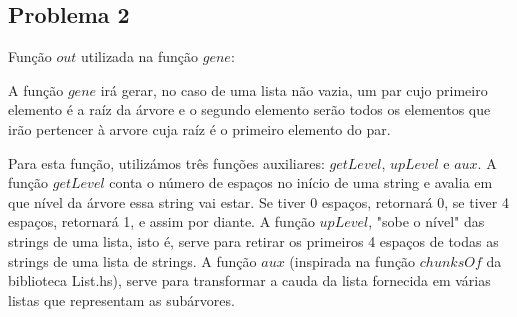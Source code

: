 \documentclass[a4paper]{article}
\newcommand{\Conid}[1]{\mathit{#1}}
\newcommand{\Varid}[1]{\mathit{#1}}
\def\resethooks{%
  \global\let\SaveRestoreHook\empty
  \global\let\ColumnHook\empty}
\let\hspre\empty
\let\hspost\empty
\begin{document}
\subsection*{Problema 2}
Função \ensuremath{\Varid{out}} utilizada na função \ensuremath{\Varid{gene}}:
\resethooks

A função \ensuremath{\Varid{gene}} irá gerar, no caso de uma lista não vazia, um par cujo primeiro elemento é a raíz
da árvore e o segundo elemento serão todos os elementos que irão pertencer à arvore cuja raíz é o primeiro
elemento do par.

Para esta função, utilizámos três funções auxiliares: \ensuremath{\Varid{getLevel}}, \ensuremath{\Varid{upLevel}} e \ensuremath{\Varid{aux}}.
A função \ensuremath{\Varid{getLevel}} conta o número de espaços no início de uma string e avalia em que nível da árvore essa
string vai estar. Se tiver 0 espaços, retornará 0, se tiver 4 espaços, retornará 1, e assim por diante.
A função \ensuremath{\Varid{upLevel}}, "sobe o nível" das strings de uma lista, isto é, serve para retirar os primeiros 4 
espaços de todas as strings de uma lista de strings.
A função \ensuremath{\Varid{aux}} (inspirada na função \ensuremath{\Varid{chunksOf}} da biblioteca List.hs), serve para transformar a cauda da 
lista fornecida em várias listas que representam as subárvores.
\end{document}
